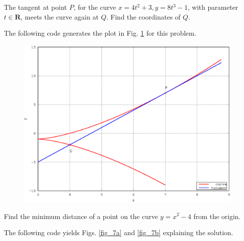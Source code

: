 \documentclass[journal,12pt,twocolumn]{IEEEtran}
\begin{document}
%
\begin{problem}
The tangent at point $P$, for the curve $x = 4t^2+3, y = 8t^3-1$, with parameter $t \in \mathbf{R}$, meets the curve again at $Q$.  Find the coordinates of $Q$.
\end{problem}
\solution 	

The following code generates the plot in Fig. \ref{fig_6} for this problem. 

\begin{figure}[!ht]
\begin{center}
\includegraphics[width=\columnwidth]{./version_2/ee16b1006/ee16b1006}
\end{center}
\label{fig_6}	
\end{figure}
%
\begin{problem}
Find the minimum distance of a point on the curve $y = x^2 -4$ from the origin.
\end{problem}
\solution

The following code yields Figs. \ref{fig_7a} and \ref{fig_7b} explaining the solution.

\renewcommand{\thefigure}{\theproblem.\arabic{figure}}
\end{document}
